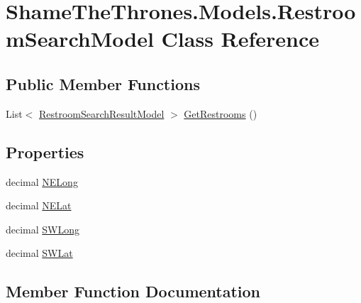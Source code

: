 \hypertarget{class_shame_the_thrones_1_1_models_1_1_restroom_search_model}{}\section{Shame\+The\+Thrones.\+Models.\+Restroom\+Search\+Model Class Reference}
\label{class_shame_the_thrones_1_1_models_1_1_restroom_search_model}
\subsection*{Public Member Functions}
\begin{DoxyCompactItemize}
\item 
List$<$ \hyperlink{class_shame_the_thrones_1_1_models_1_1_restroom_search_result_model}{Restroom\+Search\+Result\+Model} $>$ \hyperlink{class_shame_the_thrones_1_1_models_1_1_restroom_search_model_ae8253ad698818b21fb42242f2bb38bac}{Get\+Restrooms} ()
\end{DoxyCompactItemize}
\subsection*{Properties}
\begin{DoxyCompactItemize}
\item 
decimal \hyperlink{class_shame_the_thrones_1_1_models_1_1_restroom_search_model_a96a7cb96f7d506fed37d7a9d901f3531}{N\+E\+Long}
\item 
decimal \hyperlink{class_shame_the_thrones_1_1_models_1_1_restroom_search_model_af9f89969f06ff8559444515e696324dd}{N\+E\+Lat}
\item 
decimal \hyperlink{class_shame_the_thrones_1_1_models_1_1_restroom_search_model_af351d2f096c0a768b319c03fdd09f4bd}{S\+W\+Long}
\item 
decimal \hyperlink{class_shame_the_thrones_1_1_models_1_1_restroom_search_model_ac0b754f91ba1bfaaf0f81eb7c418fc1e}{S\+W\+Lat}
\end{DoxyCompactItemize}


\subsection{Member Function Documentation}
